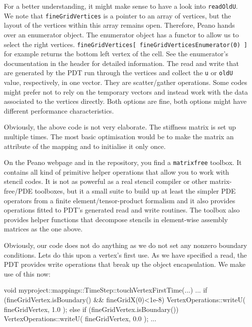For a better understanding, it might make sense to have a look into
\texttt{readOldU}.
We note that \texttt{fineGridVertices} is a pointer to an array of vertices, but
the layout of the vertices within this array remains open.
Therefore, Peano hands over an enumerator object. 
The enumerator object has a functor to allow us to select the right vertices.
\texttt{fineGridVertices[ fineGridVerticesEnumerator(0) ]} for example returns
the bottom left vertex of the cell.
See the enumerator's documentation in the header for detailed information.
The read and write that are generated by the PDT run through the vertices and
collect the \texttt{u} or \texttt{oldU} value, respectively, in one vector.
They are scatter/gather operations.
Some codes might prefer not to rely on the temporary vectors and instead work
with the data associated to the vertices directly.
Both options are fine, both options might have different performance
characteristics.

 
Obviously, the above code is not very elaborate. 
The stiffness matrix is set up multiple times.
The most basic optimisation would be to make the matrix an attribute of the
mapping and to initialise it only once.

\begin{remark}
  On the Peano webpage and in the repository, you find a \texttt{matrixfree}
  toolbox. It contains all kind of primitive helper operations that allow you to
  work with stencil codes. It is not as powerful as a real stencil compiler or 
  other matrix-free/PDE toolboxes, but it a small suite to build up at least the
  simpler PDE operators from a finite element/tensor-product formalism and it
  also provides operations fitted to PDT's generated read and write routines. 
The toolbox also provides helper functions that decompose stencils in element-wise
assembly matrices as the one above.
\end{remark}


\noindent
Obviously, our code does not do anything as we do not set any nonzero boundary
conditions. 
Lets do this upon a vertex's first use. 
As we have specified a read, the PDT provides write operations that break up the
object encapsulation.
We make use of this now:

\begin{code}
void myproject::mappings::TimeStep::touchVertexFirstTime(...) {
  ...
  if (fineGridVertex.isBoundary() && fineGridX(0)<1e-8) {
    VertexOperations::writeU( fineGridVertex, 1.0 );
  }
  else if (fineGridVertex.isBoundary()) {
    VertexOperations::writeU( fineGridVertex, 0.0 );
  }
  ...
}
\end{code}

